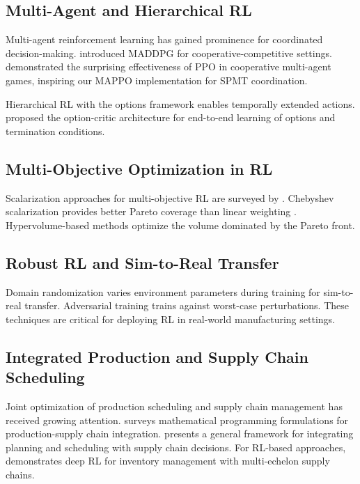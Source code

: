 \documentclass[11pt,a4paper]{article}
\begin{document}
\subsection{Multi-Agent and Hierarchical RL}

Multi-agent reinforcement learning has gained prominence for coordinated decision-making. \citet{lowe2017multi} introduced MADDPG for cooperative-competitive settings. \citet{yu2022surprising} demonstrated the surprising effectiveness of PPO in cooperative multi-agent games, inspiring our MAPPO implementation for SPMT coordination.

Hierarchical RL with the options framework \citep{sutton1999between} enables temporally extended actions. \citet{bacon2017option} proposed the option-critic architecture for end-to-end learning of options and termination conditions.

\subsection{Multi-Objective Optimization in RL}

Scalarization approaches for multi-objective RL are surveyed by \citet{hayes2022practical}. Chebyshev scalarization provides better Pareto coverage than linear weighting \citep{van2014multi}. Hypervolume-based methods \citep{zitzler2003performance} optimize the volume dominated by the Pareto front.

\subsection{Robust RL and Sim-to-Real Transfer}

Domain randomization \citep{tobin2017domain} varies environment parameters during training for sim-to-real transfer. Adversarial training \citep{pinto2017robust} trains against worst-case perturbations. These techniques are critical for deploying RL in real-world manufacturing settings.

\subsection{Integrated Production and Supply Chain Scheduling}

Joint optimization of production scheduling and supply chain management has received growing attention. \citet{mula2010mathematical} surveys mathematical programming formulations for production-supply chain integration. \citet{maravelias2012general} presents a general framework for integrating planning and scheduling with supply chain decisions. For RL-based approaches, \citet{hubbs2020or} demonstrates deep RL for inventory management with multi-echelon supply chains.
\end{document}
